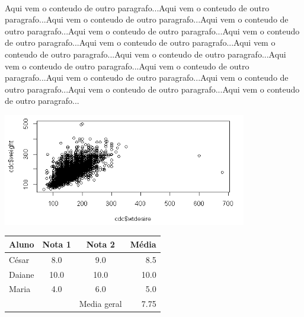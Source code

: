 \documentclass[12pt,a4paper]{article}
\begin{document}
\paragraph{}Aqui vem o conteudo de outro paragrafo...Aqui vem o conteudo de outro paragrafo...Aqui vem o conteudo de outro paragrafo...Aqui vem o conteudo de outro paragrafo...Aqui vem o conteudo de outro paragrafo...Aqui vem o conteudo de outro paragrafo...Aqui vem o conteudo de outro paragrafo...Aqui vem o conteudo de outro paragrafo...Aqui vem o conteudo de outro paragrafo...Aqui vem o conteudo de outro paragrafo...Aqui vem o conteudo de outro paragrafo...Aqui vem o conteudo de outro paragrafo...Aqui vem o conteudo de outro paragrafo...Aqui vem o conteudo de outro paragrafo...Aqui vem o conteudo de outro paragrafo...

\includegraphics[width=0.8\textwidth]{figuras/q1.PNG} %

\begin{center}
\begin{tabular}{l|c|c|r} 




\hline
Aluno & Nota 1 & Nota 2 & Média \\ \hline
César & 8.0 & 9.0 & 8.5 \\ 
Daiane & 10.0 & 10.0 & 10.0 \\
Maria & 4.0 & 6.0 & 5.0 \\ \hline
& & Media geral & 7.75 \\ \hline


\end{tabular}
\end{center}
\end{document}
